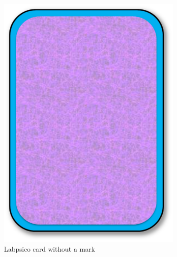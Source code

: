 \begin{figure}[!htbp]
	\centering
	\begin{subfigure}{0.4\textwidth}
		\centering
		\includegraphics[height=0.3\textheight]{fig/manuals/trivial/labpsico/card1}
		\caption{Labpsico card without a mark}\label{subfig:labpsico_card}
	\end{subfigure}\quad
	\begin{subfigure}{0.4\textwidth}
		\centering

\end{subfigure}
\end{figure}

